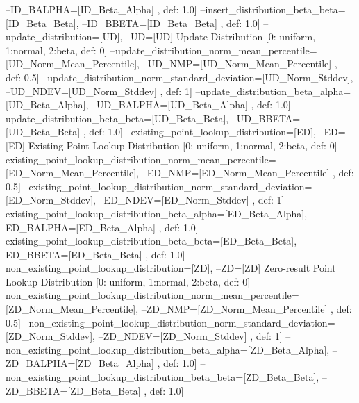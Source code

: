         --ID_BALPHA=[ID_Beta_Alpha]       , def: 1.0]
        --insert_distribution_beta_beta=[ID_Beta_Beta],
        --ID_BBETA=[ID_Beta_Beta]         , def: 1.0]
        --update_distribution=[UD],
        --UD=[UD]                         Update Distribution [0: uniform,
                                          1:normal, 2:beta, def: 0]
        --update_distribution_norm_mean_percentile=[UD_Norm_Mean_Percentile],
        --UD_NMP=[UD_Norm_Mean_Percentile]
                                          , def: 0.5]
        --update_distribution_norm_standard_deviation=[UD_Norm_Stddev],
        --UD_NDEV=[UD_Norm_Stddev]        , def: 1]
        --update_distribution_beta_alpha=[UD_Beta_Alpha],
        --UD_BALPHA=[UD_Beta_Alpha]       , def: 1.0]
        --update_distribution_beta_beta=[UD_Beta_Beta],
        --UD_BBETA=[UD_Beta_Beta]         , def: 1.0]
        --existing_point_lookup_distribution=[ED],
        --ED=[ED]                         Existing Point Lookup Distribution [0:
                                          uniform, 1:normal, 2:beta, def: 0]
        --existing_point_lookup_distribution_norm_mean_percentile=[ED_Norm_Mean_Percentile],
        --ED_NMP=[ED_Norm_Mean_Percentile]
                                          , def: 0.5]
        --existing_point_lookup_distribution_norm_standard_deviation=[ED_Norm_Stddev],
        --ED_NDEV=[ED_Norm_Stddev]        , def: 1]
        --existing_point_lookup_distribution_beta_alpha=[ED_Beta_Alpha],
        --ED_BALPHA=[ED_Beta_Alpha]       , def: 1.0]
        --existing_point_lookup_distribution_beta_beta=[ED_Beta_Beta],
        --ED_BBETA=[ED_Beta_Beta]         , def: 1.0]
        --non_existing_point_lookup_distribution=[ZD],
        --ZD=[ZD]                         Zero-result Point Lookup Distribution
                                          [0: uniform, 1:normal, 2:beta, def: 0]
        --non_existing_point_lookup_distribution_norm_mean_percentile=[ZD_Norm_Mean_Percentile],
        --ZD_NMP=[ZD_Norm_Mean_Percentile]
                                          , def: 0.5]
        --non_existing_point_lookup_distribution_norm_standard_deviation=[ZD_Norm_Stddev],
        --ZD_NDEV=[ZD_Norm_Stddev]        , def: 1]
        --non_existing_point_lookup_distribution_beta_alpha=[ZD_Beta_Alpha],
        --ZD_BALPHA=[ZD_Beta_Alpha]       , def: 1.0]
        --non_existing_point_lookup_distribution_beta_beta=[ZD_Beta_Beta],
        --ZD_BBETA=[ZD_Beta_Beta]         , def: 1.0]